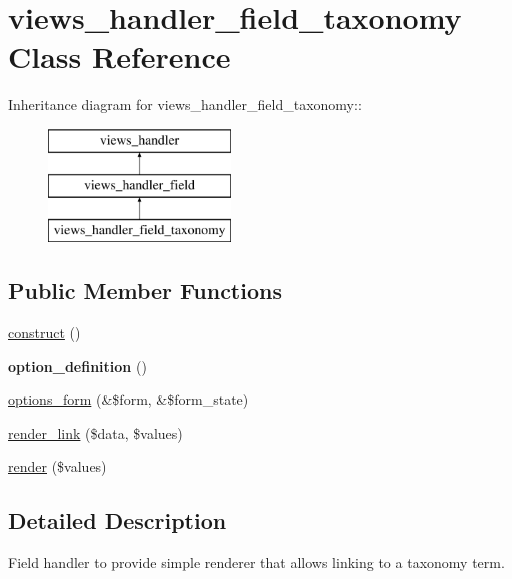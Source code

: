 \hypertarget{classviews__handler__field__taxonomy}{
\section{views\_\-handler\_\-field\_\-taxonomy Class Reference}
\label{classviews__handler__field__taxonomy}
}
Inheritance diagram for views\_\-handler\_\-field\_\-taxonomy::\begin{figure}[H]
\begin{center}
\leavevmode
\includegraphics[height=3cm]{classviews__handler__field__taxonomy}
\end{center}
\end{figure}
\subsection*{Public Member Functions}
\begin{DoxyCompactItemize}
\item 
\hyperlink{classviews__handler__field__taxonomy_a7020806fbe7b4b7c182c422dd327b0fc}{construct} ()
\item 
\hypertarget{classviews__handler__field__taxonomy_ac32837e44167ccaf8901f9782298c75b}{
{\bfseries option\_\-definition} ()}
\label{classviews__handler__field__taxonomy_ac32837e44167ccaf8901f9782298c75b}

\item 
\hyperlink{classviews__handler__field__taxonomy_adf66d3026b9409dd3237c5ebef994595}{options\_\-form} (\&\$form, \&\$form\_\-state)
\item 
\hyperlink{classviews__handler__field__taxonomy_aeeaf9833824a87e8fe2717880dc389af}{render\_\-link} (\$data, \$values)
\item 
\hyperlink{classviews__handler__field__taxonomy_a02a50e2e97c9faf4e86c5461edf5d547}{render} (\$values)
\end{DoxyCompactItemize}


\subsection{Detailed Description}
Field handler to provide simple renderer that allows linking to a taxonomy term. 

